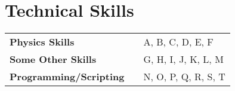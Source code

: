 \documentclass[a4,10pt]{article}
\newenvironment{zitemize}{
\begin{itemize}\itemsep0pt \parskip0pt \parsep1pt}
{\end{itemize}\vspace{-0.5cm}}
\newcommand{\hskills}[1]{
\textbf{\bfseries #1} }
\begin{document}
\section{Technical Skills}
\begin{tabular}{p{11em} p{1em} p{43em}}
\hskills{Physics Skills }&  &  A, B, C, D, E, F \\
\hskills{Some Other Skills} &  & G, H, I, J, K, L, M  \\
\hskills{Programming/Scripting} &  & N, O, P, Q, R, S, T \\
\end{tabular}
\vspace{-0.2cm}






\end{document}
